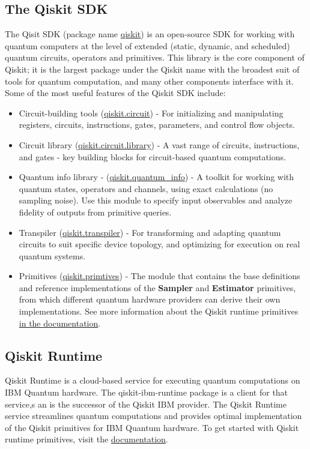 \subsection{The Qiskit SDK}
The Qisit SDK (package name \href{https://pypi.org/project/qiskit/}{qiskit}) is an open-source SDK for working with quantum computers at the level of extended (static, dynamic, and scheduled) quantum circuits, operators and primitives. This library is the core component of Qiskit; it is the largest package under the Qiskit name with the broadest suit of tools for quantum computation, and many other components interface with it.
Some of the most useful features of the Qiskit SDK include:
\begin{itemize}
    \item Circuit-building tools (\href{https://docs.quantum.ibm.com/api/qiskit/circuit}{qiskit.circuit}) - For initializing and manipulating registers, circuits, instructions, gates, parameters, and control flow objects.
    \item Circuit library (\href{https://docs.quantum.ibm.com/api/qiskit/circuit_library}{qiskit.circuit.library}) - A vast range of circuits, instructions, and gates - key building blocks for circuit-based quantum computations.
    \item Quantum info library - (\href{https://docs.quantum.ibm.com/api/qiskit/quantum_info}{qiskit.quantum\_info}) - A toolkit for working with quantum states, operators and channels, using exact calculations (no sampling noise). Use this module to specify input observables and analyze fidelity of outputs from primitive queries.
    \item Transpiler (\href{https://docs.quantum.ibm.com/api/qiskit/transpiler}{qiskit.transpiler}) - For transforming and adapting quantum circuits to suit specific device topology, and optimizing for execution on real quantum systems.
    \item Primitives (\href{https://docs.quantum.ibm.com/api/qiskit/transpiler}{qiskit.primtives}) - The module that contains the base definitions and reference implementations of the \textbf{Sampler} and \textbf{Estimator} primitives, from which different quantum hardware providers can derive their own implementations. See more information about the Qiskit runtime primitives \href{https://docs.quantum.ibm.com/guides/primitives}{in the documentation}.
\end{itemize}
\subsection{Qiskit Runtime}
Qiskit Runtime is a cloud-based service for executing quantum computations on IBM Quantum hardware. The qiskit-ibm-runtime package is a client for that service,s an is the successor of the Qiskit IBM provider. The Qiskit Runtime service streamlines quantum computations and provides optimal implementation of the Qiskit primitives for IBM Quantum hardware. To get started with Qiskit runtime primitives, visit the \href{https://docs.quantum.ibm.com/guides/primitives}{documentation}.

